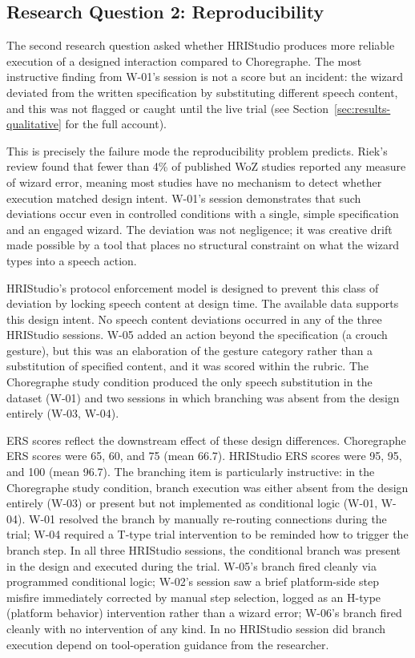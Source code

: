 \subsection{Research Question 2: Reproducibility}

The second research question asked whether HRIStudio produces more reliable execution of a designed interaction compared to Choregraphe. The most instructive finding from W-01's session is not a score but an incident: the wizard deviated from the written specification by substituting different speech content, and this was not flagged or caught until the live trial (see Section~\ref{sec:results-qualitative} for the full account).

This is precisely the failure mode the reproducibility problem predicts. Riek's~\cite{Riek2012} review found that fewer than 4\% of published WoZ studies reported any measure of wizard error, meaning most studies have no mechanism to detect whether execution matched design intent. W-01's session demonstrates that such deviations occur even in controlled conditions with a single, simple specification and an engaged wizard. The deviation was not negligence; it was creative drift made possible by a tool that places no structural constraint on what the wizard types into a speech action.

HRIStudio's protocol enforcement model is designed to prevent this class of deviation by locking speech content at design time. The available data supports this design intent. No speech content deviations occurred in any of the three HRIStudio sessions. W-05 added an action beyond the specification (a crouch gesture), but this was an elaboration of the gesture category rather than a substitution of specified content, and it was scored within the rubric. The Choregraphe study condition produced the only speech substitution in the dataset (W-01) and two sessions in which branching was absent from the design entirely (W-03, W-04).

ERS scores reflect the downstream effect of these design differences. Choregraphe ERS scores were 65, 60, and 75 (mean 66.7). HRIStudio ERS scores were 95, 95, and 100 (mean 96.7). The branching item is particularly instructive: in the Choregraphe study condition, branch execution was either absent from the design entirely (W-03) or present but not implemented as conditional logic (W-01, W-04). W-01 resolved the branch by manually re-routing connections during the trial; W-04 required a T-type trial intervention to be reminded how to trigger the branch step. In all three HRIStudio sessions, the conditional branch was present in the design and executed during the trial. W-05's branch fired cleanly via programmed conditional logic; W-02's session saw a brief platform-side step misfire immediately corrected by manual step selection, logged as an H-type (platform behavior) intervention rather than a wizard error; W-06's branch fired cleanly with no intervention of any kind. In no HRIStudio session did branch execution depend on tool-operation guidance from the researcher.

